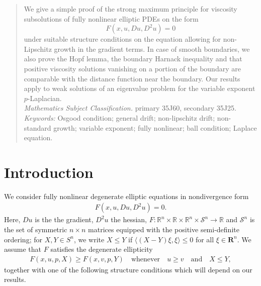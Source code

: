 \documentclass[12pt]{article}
\numberwithin{komcounter}{section}
\begin{document}
\begin{abstract}

\noindent
We give a simple proof of the strong maximum principle for viscosity subsolutions of
fully nonlinear elliptic PDEs on the form
$$
F(x,u,Du,D^2u) = 0
$$
under suitable structure conditions on the equation allowing for non-Lipschitz growth in the gradient terms.
In case of smooth boundaries, we also prove the Hopf lemma, the boundary Harnack inequality and that positive viscosity solutions vanishing on a portion of the boundary are comparable with the distance function near the boundary.
Our results apply to weak solutions of an eigenvalue problem for the variable exponent $p$-Laplacian. \\

\noindent
{\em Mathematics Subject Classification.} primary 35J60, secondary 35J25.\\

\noindent
{\it Keywords:} Osgood condition; general drift; non-lipschitz drift; non-standard growth; variable exponent; fully nonlinear; ball condition;  Laplace equation.
%
\end{abstract}






\section{Introduction}

\setcounter{theorem}{0}
\setcounter{equation}{0}

We consider fully nonlinear degenerate elliptic equations in nondivergence form
%
\begin{align}\label{eq:main}
F(x,u,Du,D^2u) = 0. \tag{$PDE$}
\end{align}
%
Here, $Du$ is the the gradient, $D^2u$ the hessian,
$F:\mathbb{R}^n \times \mathbb{R} \times \mathbb{R}^n  \times \mathcal{S}^n \rightarrow \mathbb{R}$ and $\mathcal{S}^n$ is the set of symmetric $n \times n$ matrices equipped with the positive semi-definite ordering;
for $X, Y \in S^n$, we write $X \leq Y$ if $\langle (X - Y) \xi, \xi \rangle \leq 0$ for all $\xi \in \mathbf{R}^n$.
%
We assume that $F$ satisfies the degenerate ellipticity
%
\begin{align}\label{eq:ass_deg_ellipt}
F(x,u,p,X) \geq  F(x,v,p,Y)  \quad \text{whenever} \quad u \geq v  \quad \text{and} \quad X \leq Y, \tag{$F_1$}
\end{align}
%
together with one of the following structure conditions which will depend on our results.
\end{document}
